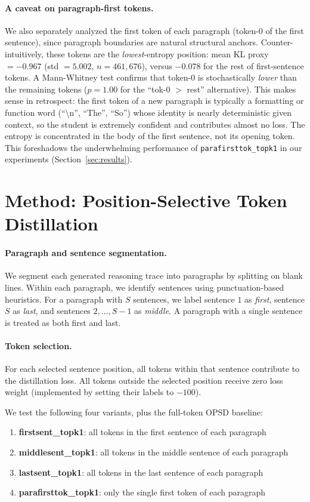 \documentclass{article}
\begin{document}
\paragraph{A caveat on paragraph-first tokens.}
We also separately analyzed the first token of each paragraph (token-0 of the first sentence), since paragraph boundaries are natural structural anchors.
Counter-intuitively, these tokens are the \emph{lowest}-entropy position: mean KL proxy $= -0.967$ (std $= 5.002$, $n = 461{,}676$), versus $-0.078$ for the rest of first-sentence tokens.
A Mann-Whitney test confirms that token-0 is stochastically \emph{lower} than the remaining tokens ($p = 1.00$ for the ``tok-0 $>$ rest'' alternative).
This makes sense in retrospect: the first token of a new paragraph is typically a formatting or function word (``\textbackslash n'', ``The'', ``So'') whose identity is nearly deterministic given context, so the student is extremely confident and contributes almost no loss.
The entropy is concentrated in the body of the first sentence, not its opening token.
This foreshadows the underwhelming performance of \texttt{parafirsttok\_topk1} in our experiments (Section~\ref{sec:results}).

\section{Method: Position-Selective Token Distillation}
\label{sec:method}

\paragraph{Paragraph and sentence segmentation.}
We segment each generated reasoning trace into paragraphs by splitting on blank lines.
Within each paragraph, we identify sentences using punctuation-based heuristics.
For a paragraph with $S$ sentences, we label sentence $1$ as \emph{first}, sentence $S$ as \emph{last}, and sentences $2, \ldots, S-1$ as \emph{middle}.
A paragraph with a single sentence is treated as both first and last.

\paragraph{Token selection.}
For each selected sentence position, all tokens within that sentence contribute to the distillation loss.
All tokens outside the selected position receive zero loss weight (implemented by setting their labels to $-100$).

We test the following four variants, plus the full-token OPSD baseline:
\begin{enumerate}
    \item \textbf{firstsent\_topk1}: all tokens in the first sentence of each paragraph
    \item \textbf{middlesent\_topk1}: all tokens in the middle sentence of each paragraph
    \item \textbf{lastsent\_topk1}: all tokens in the last sentence of each paragraph
    \item \textbf{parafirsttok\_topk1}: only the single first token of each paragraph
\end{enumerate}
\end{document}
